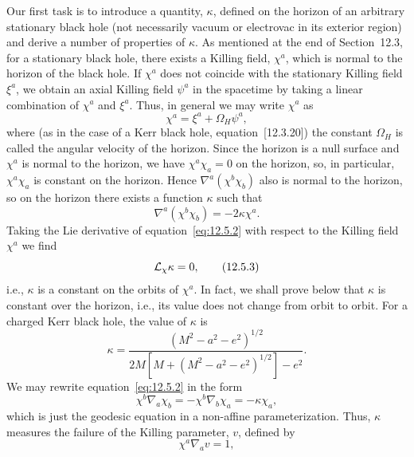 Our first task is to introduce a quantity, \(\kappa\), defined on the horizon of an
arbitrary stationary black hole (not necessarily vacuum or electrovac in its exterior
region) and derive a number of properties of \(\kappa\). As mentioned at the end of
Section~12.3, for a stationary black hole, there exists a Killing field, \(\chi^a\),
which is normal to the horizon of the black hole. If \(\chi^a\) does not coincide with
the stationary Killing field \(\xi^a\), we obtain an axial Killing field \(\psi^a\) in
the spacetime by taking a linear combination of \(\chi^a\) and \(\xi^a\). Thus, in
general we may write \(\chi^a\) as
\begin{equation}
 \chi^a=\xi^a+\Omega_H\psi^a ,
 \tag{12.5.1}\label{eq:12.5.1}
\end{equation}
where (as in the case of a Kerr black hole, equation~[12.3.20]) the constant
\(\Omega_H\) is called the angular velocity of the horizon. Since the horizon is a
null surface and \(\chi^a\) is normal to the horizon, we have \(\chi^a\chi_a=0\) on
the horizon, so, in particular, \(\chi^a\chi_a\) is constant on the horizon. Hence
\(\nabla^a(\chi^b\chi_b)\) also is normal to the horizon, so on the horizon there
exists a function \(\kappa\) such that
\begin{equation}
 \nabla^a(\chi^b\chi_b)=-2\kappa\chi^a .
 \tag{12.5.2}\label{eq:12.5.2}
\end{equation}
Taking the Lie derivative of equation~\eqref{eq:12.5.2} with respect to the Killing
field \(\chi^a\) we find
\begin{equation}
 \mathcal{L}_\chi\kappa=0 ,
 \tag{12.5.3}\label{eq:12.5.3}
\end{equation}
i.e., \(\kappa\) is a constant on the orbits of \(\chi^a\). In fact, we shall prove
below that \(\kappa\) is constant over the horizon, i.e., its value does not change
from orbit to orbit. For a charged Kerr black hole, the value of \(\kappa\) is
\begin{equation}
 \kappa=\frac{(M^2-a^2-e^2)^{1/2}}
 {2M\left[M+(M^2-a^2-e^2)^{1/2}\right]-e^2} .
 \tag{12.5.4}\label{eq:12.5.4}
\end{equation}
We may rewrite equation~\eqref{eq:12.5.2} in the form
\begin{equation}
 \chi^b\nabla_a\chi_b=-\chi^b\nabla_b\chi_a=-\kappa\chi_a ,
 \tag{12.5.5}\label{eq:12.5.5}
\end{equation}
which is just the geodesic equation in a non-affine parameterization. Thus, \(\kappa\)
measures the failure of the Killing parameter, \(v\), defined by
\begin{equation}
 \chi^a\nabla_av=1 ,
 \tag{12.5.6}\label{eq:12.5.6}
\end{equation}
